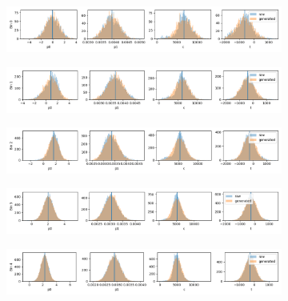 \begin{figure}[H]
    \centering
\begin{subfigure}[b]{0.85\textwidth}
    \centering
    \includegraphics[width=\linewidth]{figures/chapter4/surrogates/p3_histos_post_0.png}
  \end{subfigure}
\begin{subfigure}[b]{0.85\textwidth}
    \centering
    \includegraphics[width=\linewidth]{figures/chapter4/surrogates/p3_histos_post_1.png}
  \end{subfigure}
\begin{subfigure}[b]{0.85\textwidth}
    \centering
    \includegraphics[width=\linewidth]{figures/chapter4/surrogates/p3_histos_post_2.png}
  \end{subfigure}
\begin{subfigure}[b]{0.85\textwidth}
    \centering
    \includegraphics[width=\linewidth]{figures/chapter4/surrogates/p3_histos_post_3.png}
  \end{subfigure}
\begin{subfigure}[b]{0.85\textwidth}
    \centering
    \includegraphics[width=\linewidth]{figures/chapter4/surrogates/p3_histos_post_4.png}

\end{subfigure}
\end{figure}
